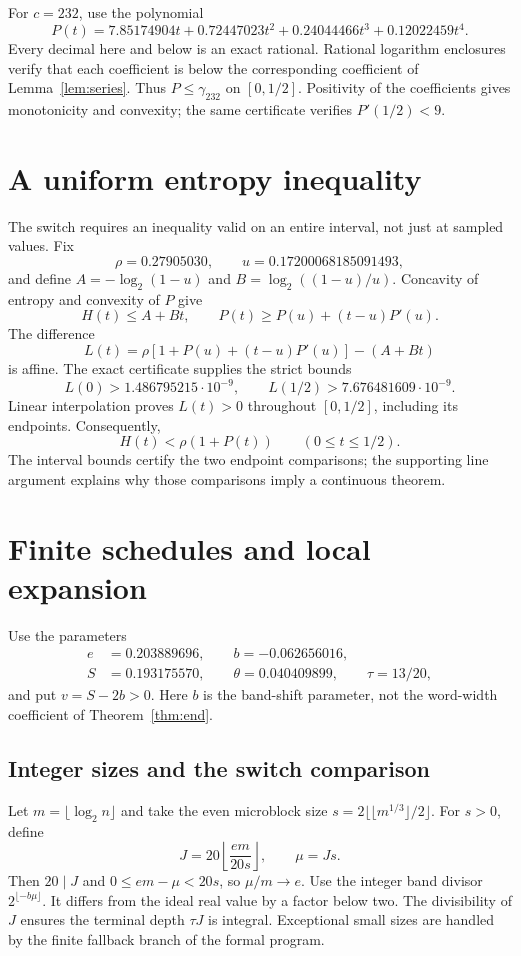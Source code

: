 \documentclass[11pt,a4paper]{article}
\begin{document}
For $c=232$, use the polynomial
\begin{equation}\label{eq:quartic}
 P(t)=7.85174904t+0.72447023t^2+0.24044466t^3+0.12022459t^4.
\end{equation}
Every decimal here and below is an exact rational. Rational logarithm
enclosures verify that each coefficient is below the corresponding
coefficient of Lemma~\ref{lem:series}. Thus $P\le\gamma_{232}$ on
$[0,1/2]$. Positivity of the coefficients gives monotonicity and convexity;
the same certificate verifies $P'(1/2)<9$.

\section{A uniform entropy inequality}
The switch requires an inequality valid on an entire interval, not just
at sampled values. Fix
\[
 \rho=0.27905030,\qquad u=0.17200068185091493,
\]
and define $A=-\log_2(1-u)$ and $B=\log_2((1-u)/u)$.
Concavity of entropy and convexity of $P$ give
\[
 H(t)\le A+Bt,\qquad
 P(t)\ge P(u)+(t-u)P'(u).
\]
The difference
\[
 L(t)=\rho[1+P(u)+(t-u)P'(u)]-(A+Bt)
\]
is affine. The exact certificate supplies the strict bounds
\[
 L(0)>1.486795215\cdot10^{-9},\qquad
 L(1/2)>7.676481609\cdot10^{-9}.
\]
Linear interpolation proves $L(t)>0$ throughout $[0,1/2]$, including its
endpoints. Consequently,
\begin{equation}\label{eq:uniform}
 H(t)<\rho(1+P(t))\qquad(0\le t\le1/2).
\end{equation}
The interval bounds certify the two endpoint comparisons; the supporting
line argument explains why those comparisons imply a continuous theorem.

\section{Finite schedules and local expansion}
Use the parameters
\begin{equation}\label{eq:params}
\begin{split}
 e&=0.203889696,\qquad b=-0.062656016,\\
 S&=0.193175570,\qquad \theta=0.040409899,\qquad \tau=13/20,
\end{split}
\end{equation}
and put $v=S-2b>0$. Here $b$ is the band-shift parameter, not the
word-width coefficient of Theorem~\ref{thm:end}.

\subsection{Integer sizes and the switch comparison}
Let $m=\lfloor\log_2 n\rfloor$ and take the even microblock size
$s=2\lfloor\lfloor m^{1/3}\rfloor/2\rfloor$. For $s>0$, define
\[
 J=20\left\lfloor\frac{em}{20s}\right\rfloor,\qquad \mu=Js.
\]
Then $20\mid J$ and $0\le em-\mu<20s$, so $\mu/m\to e$.
Use the integer band divisor $2^{\lfloor-b\mu\rfloor}$. It differs from
the ideal real value by a factor below two. The divisibility of $J$
ensures the terminal depth $\tau J$ is integral. Exceptional small sizes
are handled by the finite fallback branch of the formal program.
\end{document}
